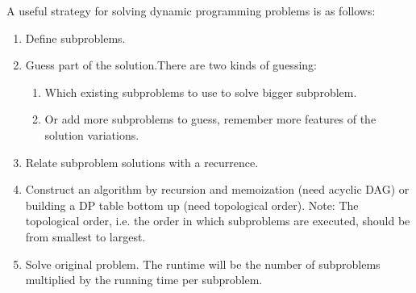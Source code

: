 \documentclass{article}
\begin{document}
    A useful strategy for solving dynamic programming problems is as follows:
    
    \begin{enumerate}
        \item Define subproblems.
        
        \item Guess part of the solution.There are two kinds of guessing:
        \begin{enumerate}
            \item Which existing subproblems to use to solve bigger subproblem.
            \item Or add more subproblems to guess, remember more features of the solution variations.
        \end{enumerate}
        
        \item Relate subproblem solutions with a recurrence.
        
        \item Construct an algorithm by recursion and memoization (need acyclic DAG) or building a DP table bottom up (need topological order). Note: The topological order, i.e. the order in which subproblems are executed, should be from smallest to largest.
        
        \item Solve original problem. The runtime will be the number of subproblems multiplied by the running time per subproblem.
    \end{enumerate}
    
    
    
    
\end{document}

